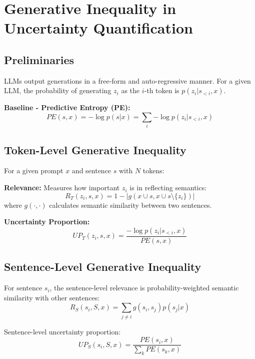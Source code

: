 \section{Generative Inequality in Uncertainty Quantification}

\subsection{Preliminaries}
LLMs output generations in a free-form and auto-regressive manner. For a given LLM, the probability of generating $z_i$ as the $i$-th token is $p(z_i|s_{<i}, x)$.

\textbf{Baseline - Predictive Entropy (PE):}
\begin{equation}
PE(s, x) = -\log p(s|x) = \sum_{i}{-\log p(z_i|s_{<i}, x)}
\end{equation}

\subsection{Token-Level Generative Inequality}
For a given prompt $x$ and sentence $s$ with $N$ tokens:

\textbf{Relevance:} Measures how important $z_i$ is in reflecting semantics:
\begin{equation}
R_T(z_i, s, x) = 1 - |g(x \cup s, x \cup s \setminus \{z_i\})|
\end{equation}
where $g(\cdot, \cdot)$ calculates semantic similarity between two sentences.

\textbf{Uncertainty Proportion:}
\begin{equation}
UP_T(z_i, s, x) = \frac{-\log p(z_i|s_{<i}, x)}{PE(s, x)}
\end{equation}

\subsection{Sentence-Level Generative Inequality}
For sentence $s_i$, the sentence-level relevance is probability-weighted semantic similarity with other sentences:
\begin{equation}
R_S(s_i, S, x) = \sum_{j \neq i}{g(s_i, s_j)p(s_j|x)}
\end{equation}

Sentence-level uncertainty proportion:
\begin{equation}
UP_S(s_i, S, x) = \frac{PE(s_i, x)}{\sum_k{PE(s_k, x)}}
\end{equation}

